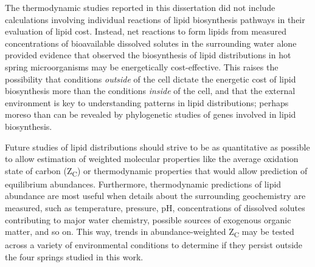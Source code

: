 The thermodynamic studies reported in this dissertation did not include calculations involving individual reactions of lipid biosynthesis pathways in their evaluation of lipid cost. Instead, net reactions to form lipids from measured concentrations of bioavailable dissolved solutes in the surrounding water alone provided evidence that observed the biosynthesis of lipid distributions in hot spring microorganisms may be energetically cost-effective. This raises the possibility that conditions \textit{outside} of the cell dictate the energetic cost of lipid biosynthesis more than the conditions \textit{inside} of the cell, and that the external environment is key to understanding patterns in lipid distributions; perhaps moreso than can be revealed by phylogenetic studies of genes involved in lipid biosynthesis.





Future studies of lipid distributions should strive to be as quantitative as possible to allow estimation of weighted molecular properties like the average oxidation state of carbon (Z\textsubscript{C}) or thermodynamic properties that would allow prediction of equilibrium abundances. Furthermore, thermodynamic predictions of lipid abundance are most useful when details about the surrounding geochemistry are measured, such as temperature, pressure, pH, concentrations of dissolved solutes contributing to major water chemistry, possible sources of exogenous organic matter, and so on. This way, trends in abundance-weighted Z\textsubscript{C} may be tested across a variety of environmental conditions to determine if they persist outside the four springs studied in this work.

